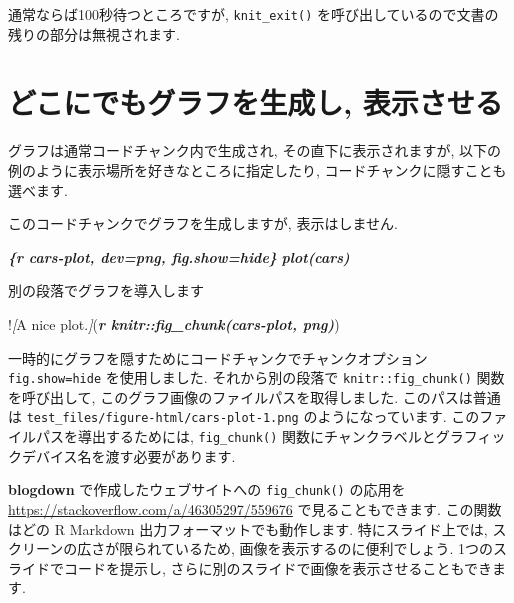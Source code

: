 \documentclass[
  11pt,
  lualatex,
  ja=standard]{bxjsreport}
\newenvironment{Shaded}{\begin{snugshade}}{\end{snugshade}}
\newcommand{\CommentTok}[1]{\textcolor[rgb]{0.56,0.35,0.01}{\textit{#1}}}
\newcommand{\InformationTok}[1]{\textcolor[rgb]{0.56,0.35,0.01}{\textbf{\textit{#1}}}}
\newcommand{\NormalTok}[1]{#1}
\newcommand{\OtherTok}[1]{\textcolor[rgb]{0.56,0.35,0.01}{#1}}
\begin{document}
通常ならば100秒待つところですが, \texttt{knit\_exit()} を呼び出しているので文書の残りの部分は無視されます.

\hypertarget{fig-chunk}{%
\section{どこにでもグラフを生成し, 表示させる}\label{fig-chunk}}

グラフは通常コードチャンク内で生成され, その直下に表示されますが, 以下の例のように表示場所を好きなところに指定したり, コードチャンクに隠すことも選べます.

\begin{Shaded}
\begin{Highlighting}[]
\NormalTok{このコードチャンクでグラフを生成しますが, 表示はしません.}

\InformationTok{\textasciigrave{}\textasciigrave{}\textasciigrave{}\{r cars{-}plot, dev=\textquotesingle{}png\textquotesingle{}, fig.show=\textquotesingle{}hide\textquotesingle{}\}}
\InformationTok{plot(cars)}
\InformationTok{\textasciigrave{}\textasciigrave{}\textasciigrave{}}

\NormalTok{別の段落でグラフを導入します}

\NormalTok{!}\CommentTok{[}\OtherTok{A nice plot.}\CommentTok{]}\NormalTok{(}\InformationTok{\textasciigrave{}r knitr::fig\_chunk(\textquotesingle{}cars{-}plot\textquotesingle{}, \textquotesingle{}png\textquotesingle{})\textasciigrave{}}\NormalTok{)}
\end{Highlighting}
\end{Shaded}

一時的にグラフを隠すためにコードチャンクでチャンクオプション \texttt{fig.show=\textquotesingle{}hide\textquotesingle{}} を使用しました. それから別の段落で \texttt{knitr::fig\_chunk()} 関数を呼び出して, このグラフ画像のファイルパスを取得しました. このパスは普通は \texttt{test\_files/figure-html/cars-plot-1.png} のようになっています. このファイルパスを導出するためには, \texttt{fig\_chunk()} 関数にチャンクラベルとグラフィックデバイス名を渡す必要があります.

\textbf{blogdown} で作成したウェブサイトへの \texttt{fig\_chunk()} の応用を \url{https://stackoverflow.com/a/46305297/559676} で見ることもできます. この関数はどの R Markdown 出力フォーマットでも動作します. 特にスライド上では, スクリーンの広さが限られているため, 画像を表示するのに便利でしょう. 1つのスライドでコードを提示し, さらに別のスライドで画像を表示させることもできます.
\end{document}
